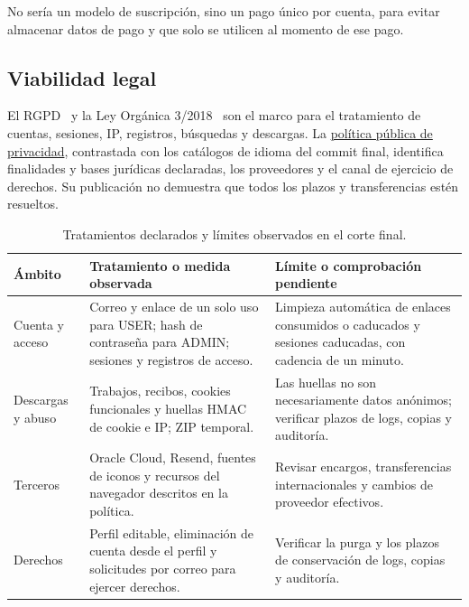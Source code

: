 No sería un modelo de suscripción, sino un pago único por cuenta, para evitar almacenar datos de pago y que solo se utilicen al momento de ese pago.

\subsection{Viabilidad legal}

El RGPD~\cite{rgpd} y la Ley Orgánica 3/2018~\cite{lopdgdd} son el marco para el tratamiento de cuentas, sesiones, IP, registros, búsquedas y descargas. La \href{https://batchdownloader.dev/privacy}{política pública de privacidad}, contrastada con los catálogos de idioma del commit final, identifica finalidades y bases jurídicas declaradas, los proveedores y el canal de ejercicio de derechos. Su publicación no demuestra que todos los plazos y transferencias estén resueltos.

\begin{table}[H]
	\centering\small
	\begin{tabularx}{\textwidth}{p{}p{}X}
		\toprule
		\textbf{Ámbito}   & \textbf{Tratamiento o medida observada}                                                                  & \textbf{Límite o comprobación pendiente}                                                               \\
		\midrule
		Cuenta y acceso   & Correo y enlace de un solo uso para USER; hash de contraseña para ADMIN; sesiones y registros de acceso. & Limpieza automática de enlaces consumidos o caducados y sesiones caducadas, con cadencia de un minuto. \\
		Descargas y abuso & Trabajos, recibos, cookies funcionales y huellas HMAC de cookie e IP; ZIP temporal.                      & Las huellas no son necesariamente datos anónimos; verificar plazos de logs, copias y auditoría.        \\
		Terceros          & Oracle Cloud, Resend, fuentes de iconos y recursos del navegador descritos en la política.               & Revisar encargos, transferencias internacionales y cambios de proveedor efectivos.                     \\
		Derechos          & Perfil editable, eliminación de cuenta desde el perfil y solicitudes por correo para ejercer derechos.   & Verificar la purga y los plazos de conservación de logs, copias y auditoría.                           \\
		\bottomrule
	\end{tabularx}
	\caption{Tratamientos declarados y límites observados en el corte final.}
	\label{tabla:viabilidad-legal-datos}
\end{table}

